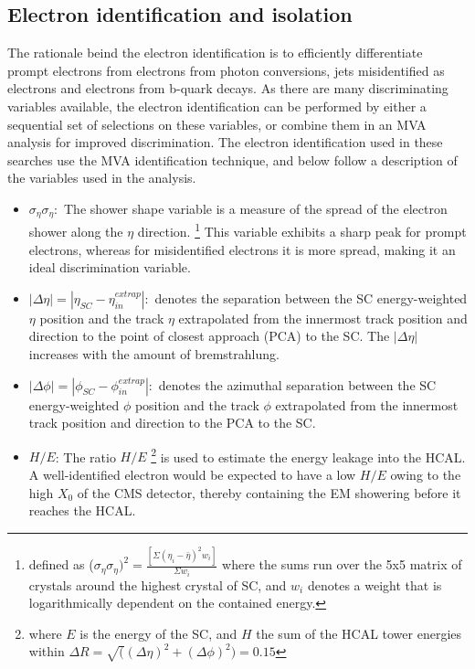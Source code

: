 \subsection{Electron identification and isolation}
The rationale beind the electron identification is to efficiently differentiate prompt electrons from electrons from photon conversions, jets misidentified as electrons and electrons from b-quark decays.  
As there are many discriminating variables available, the electron identification can be performed by either a sequential set of selections on these variables, or combine them in an MVA analysis for improved discrimination.
The electron identification used in these searches use the MVA identification technique, and below follow a description of the variables used in the analysis. 
\begin{itemize}\addtolength{\itemsep}{0.5\baselineskip}
\item $\sigma_{\eta}\sigma_{\eta}:$ 
The shower shape variable is a measure of the spread of the electron shower along the $\eta$ direction.
\footnote{defined as ($\sigma_{\eta}\sigma_{\eta})^{2}=\frac{[\Sigma (\eta_i-\bar{\eta})^{2}w_i]}{\Sigma w_i}$ where the sums run over the 5x5 matrix of crystals around the highest \ET crystal of SC, and $w_i$ denotes a weight that is logarithmically dependent on the contained energy.}
This variable exhibits a sharp peak for prompt electrons, whereas for misidentified electrons it is more spread, making it an ideal discrimination variable.  
\item $|\Delta \eta| = |\eta_{SC}-\eta_{in}^{extrap}|:$
denotes the separation between the SC energy-weighted $\eta$ position and the track $\eta$ extrapolated from the innermost track position and direction to the point of closest approach (PCA) to the SC.
The $|\Delta \eta|$ increases with the amount of bremstrahlung. 
\item $|\Delta \phi| = |\phi_{SC}-\phi_{in}^{extrap}|:$
denotes the azimuthal separation between the SC energy-weighted $\phi$ position and the track $\phi$ extrapolated from the innermost track position and direction to the PCA to the SC.
\item $H/E$: 
The ratio $H/E$ \footnote{where $E$ is the energy of the SC, and $H$ the sum of the HCAL tower energies within $\Delta R = \sqrt((\Delta \eta )^{2}+ (\Delta \phi )^{2}) = 0.15$} is used to estimate the energy leakage into the HCAL. 
A well-identified electron would be expected to have a low $H/E$ owing to the high $X_0$ of the CMS detector, thereby containing the EM showering before it reaches the HCAL. 

\end{itemize}
